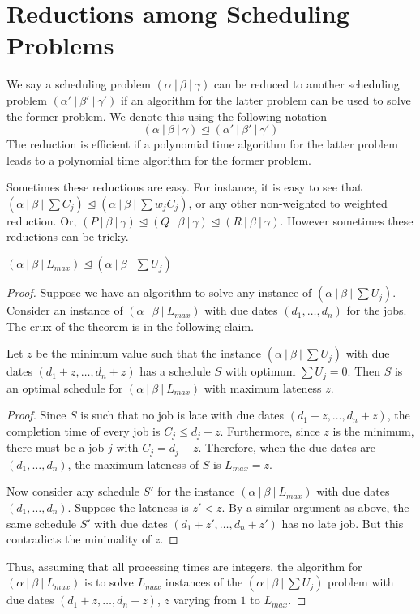 \documentclass[11pt]{article}
\begin{document}
\MakeScribeTop
\def\lle{\trianglelefteq}
\section{Reductions among Scheduling Problems}
We say a scheduling problem $(\alpha~|~\beta~|~\gamma)$ can be reduced to another scheduling problem $(\alpha'~|~\beta'~|~\gamma')$ 	
if an algorithm for the latter problem can be used to solve the former problem. We denote this using the following notation
$$ (\alpha~|~\beta~|~\gamma)  \lle (\alpha'~|~\beta'~|~\gamma') $$
The reduction is efficient if a polynomial time algorithm for the latter problem leads to a polynomial time algorithm for the former problem.

Sometimes these reductions are easy. For instance, it is easy to see that $(\alpha~|~\beta~|~\sum C_j) \lle (\alpha~|~\beta~|~\sum w_jC_j)$, or any other non-weighted to weighted reduction. Or, $(P~|~\beta~|~\gamma) \lle (Q~|~\beta~|~\gamma) \lle (R~|~\beta~|~\gamma)$.
However sometimes these reductions can be tricky. 

\begin{theorem}
$(\alpha~|~\beta~|~L_{max}) \lle (\alpha~|~\beta~|~\sum U_j)$
\end{theorem}
\begin{proof}
Suppose we have an algorithm to solve any instance of $(\alpha~|~\beta~|~\sum U_j)$. Consider an instance of $(\alpha~|~\beta~|~L_{max})$
with due dates $(d_1,\ldots,d_n)$ for the jobs. The crux of the theorem is in the following claim.
\begin{claim}
Let $z$ be the minimum value such that the instance $(\alpha~|~\beta~|~\sum U_j)$ with due dates $(d_1+z,\ldots,d_n+z)$ has a schedule $S$ with
optimum $\sum U_j = 0$. Then $S$ is an optimal schedule for $(\alpha~|~\beta~|~L_{max})$ with maximum lateness $z$.
\end{claim}
\begin{proof}
Since $S$ is such that no job is late with due dates $(d_1+z,\ldots,d_n+z)$, the completion time of every job is $C_j \le d_j+z$. 
Furthermore, since $z$ is the minimum, there must be a job $j$ with $C_j = d_j + z$. Therefore, when the due dates are 
$(d_1,\ldots,d_n)$, the maximum lateness of $S$ is $L_{max} = z$.

Now consider any schedule $S'$ for the instance  $(\alpha~|~\beta~|~L_{max})$ with due dates $(d_1,\ldots, d_n)$.
Suppose the lateness is $z' < z$. By a similar argument as above, the same schedule $S'$ with due dates
$(d_1+z',\ldots,d_n+z')$ has no late job. But this contradicts the minimality of $z$. 
\end{proof}

Thus, assuming that all processing times are integers, the algorithm for $(\alpha~|~\beta~|~L_{max})$ is to solve $L_{max}$ instances
of the $(\alpha~|~\beta~|~\sum U_j)$ problem with due dates $(d_1+z,\ldots,d_n+z)$, $z$ varying from $1$ to $L_{max}$. 
\end{proof}
\end{document}
